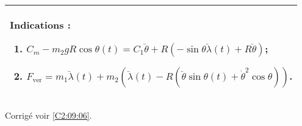 \ifprof
\else
\footnotesize
\begin{center}
\begin{tabular}{|p{.9\linewidth}|}
\hline
Indications :
\begin{enumerate}
\item $ C_m-m_2 g R  \cos\theta(t) = C_1  \ddot{\theta} + R\left( -\sin \theta \ddot{\lambda}(t) + R \ddot{\theta} \right)$;
\item $F_{\text{ver}}=m_1\ddot{\lambda}(t)+m_2\left(\ddot{\lambda}(t)- R \left(\ddot{\theta} \sin\theta(t)  + \dot{\theta}^2 \cos\theta \right)\right)$. 
\end{enumerate} \\ \hline
\end{tabular}
\end{center}
\normalsize
\begin{flushright}
\footnotesize{Corrigé  voir \ref{C2:09:06}.}
\end{flushright}%
\fi